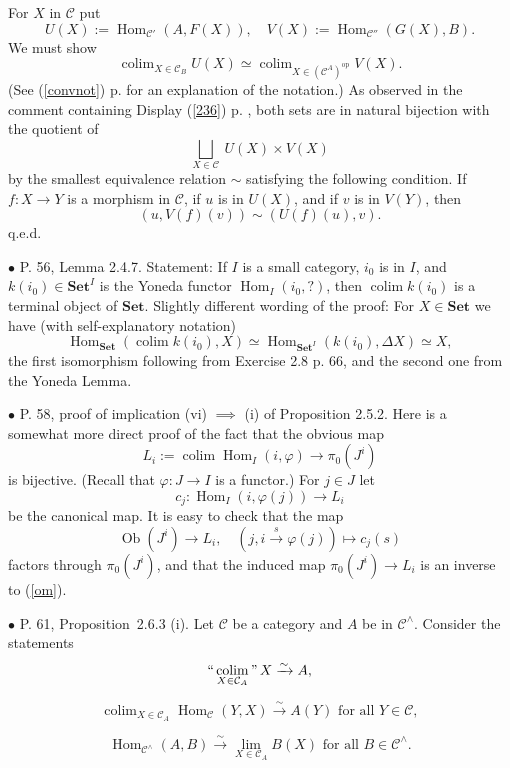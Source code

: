 \documentclass[12pt]{article}
\theoremstyle{remark}
\newcommand{\bu}{\bullet}
\newcommand{\n}{\noindent}
\newcommand{\C}{\mathcal C}
\newcommand{\Set}{\textbf{Set}}
\newcommand{\op}{\text{op}}
\newcommand{\p}{\varphi}
\newcommand{\pr}{Proposition}
\newcommand{\cn}{(See (\ref{convnot}) p. \pageref{convnot} for an explanation of the notation.) }
\DeclareMathOperator*{\coli}{colim}
\DeclareMathOperator*{\co}{colim}
\DeclareMathOperator*{\ic}{``\coli"}
\DeclareMathOperator{\Hom}{Hom}
\DeclareMathOperator{\h}{Hom}
\DeclareMathOperator{\Ob}{Ob}
\begin{document}
\n{\em Second proof.} For $X$ in $\C$ put 
$$
U(X):=\h_{\C'}(A,F(X)),\quad V(X):=\h_{\C''}(G(X),B). 
$$ 
We must show 
$$
\co_{X\in\C_B}U(X)\simeq\co_{X\in(\C^A)^\op}V(X). 
$$ 
\cn As observed in the comment containing Display (\ref{236}) p. \pageref{236}, both sets are in natural bijection with the quotient of 
$$
\bigsqcup_{X\in\C}\ U(X)\times V(X) 
$$ 
by the smallest equivalence relation $\sim$ satisfying the following condition. If $f:X\to Y$ is a morphism in $\C$, if $u$ is in $U(X)$, and if $v$ is in $V(Y)$, then 
$$
(u,V(f)(v))\sim(U(f)(u),v). 
$$ 
q.e.d. 


\n$\bu$ P. 56, Lemma 2.4.7. Statement: If $I$ is a small category, $i_0$ is in $I$, and $k(i_0)\in\Set^I$ is the Yoneda functor $\Hom_I(i_0,?)$, then $\coli k(i_0)$ is a terminal object of $\Set$. Slightly different wording of the proof: For $X\in\Set$ we have (with self-explanatory notation)
$$
\Hom_\Set\left(\coli k(i_0),X\right)\simeq\Hom_{\Set^I}(k(i_0),\Delta X)\simeq X,
$$
the first isomorphism following from Exercise 2.8 p. 66, and the second one from the Yoneda Lemma. 

% 

\n$\bu$ P. 58, proof of implication (vi) $\implies$ (i) of Proposition 2.5.2. Here is a somewhat more direct proof of the fact that the obvious map  
\begin{equation}\label{om}
L_i:=\coli\Hom_I(i,\p)\to\pi_0(J^i)
\end{equation}
is bijective. (Recall that $\p:J\to I$ is a functor.) For $j\in J$ let 
$$
c_j:\Hom_I(i,\p(j))\to L_i
$$
be the canonical map. It is easy to check that the map 
$$
\Ob(J^i)\to L_i,\quad (j,i\overset{s}{\to}\p(j))\mapsto c_j(s)
$$
factors through $\pi_0(J^i)$, and that the induced map $\pi_0(J^i)\to L_i$ is an inverse to (\ref{om}). 


\n$\bu$ P. 61, \pr\ 2.6.3 (i). Let $\C$ be a category and $A$ be in $\C^\wedge$. Consider the statements  
% 
\begin{equation}\label{263a}
\ic_{X\in\C_A}X\xrightarrow\sim A, 
\end{equation} 

\begin{equation}\label{263b}
\co_{X\in\C_A}\h_\C(Y,X)\xrightarrow\sim A(Y)\text{ for all }Y\in\C, 
\end{equation}

\begin{equation}\label{263} 
\h_{\C^\wedge}(A,B)\xrightarrow\sim\lim_{X\in\C_A}B(X)\text{ for all }B\in\C^\wedge. 
\end{equation} 
\end{document}
